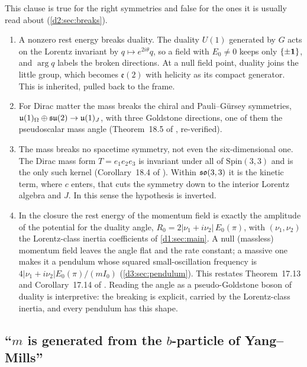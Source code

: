 This clause is true for the right symmetries and false for the ones it is usually read about (\cref{d2:sec:breaks}).
\begin{enumerate}
\item A nonzero rest energy breaks duality. The duality $U(1)$ generated by $G$ acts on the Lorentz invariant by $q\mapsto e^{2i\theta}q$, so
a field with $E_0\neq0$ keeps only $\{\pm\mathbf 1\}$, and $\arg q$ labels the broken directions. At a null field point, duality joins the
little group, which becomes $\mathfrak e(2)$ with helicity as its compact generator. This is inherited, pulled back to the frame.
\item For Dirac matter the mass breaks the chiral and Pauli--G\"ursey symmetries, $\mathfrak{u}(1)_\Omega\oplus\mathfrak{su}(2)\to\mathfrak{u}(1)_J$, with three Goldstone
directions, one of them the pseudoscalar mass angle (Theorem~18.5 of \cite{ES17}, re-verified).
\item The mass breaks no spacetime symmetry, not even the six-dimensional one. The Dirac mass form $T=e_1e_2e_3$ is invariant under all of
$\mathrm{Spin}(3,3)$ and is the only such kernel (Corollary~18.4 of \cite{ES17}). Within $\mathfrak{so}(3,3)$ it is the kinetic term, where $c$
enters, that cuts the symmetry down to the interior Lorentz algebra and $J$. In this sense the hypothesis is inverted.
\item In the closure the rest energy of the momentum field is exactly the amplitude of the potential for the duality angle,
$R_0=2|\nu_1+i\nu_2|\,E_0(\pi)$, with $(\nu_1,\nu_2)$ the Lorentz-class inertia coefficients of
\cref{d1:sec:main}. A null (massless) momentum field leaves the angle flat and the rate constant; a massive one makes it a pendulum
whose squared small-oscillation frequency is
$4|\nu_1+i\nu_2|E_0(\pi)/(mI_0)$ (\cref{d3:sec:pendulum}). This restates Theorem~17.13 and
Corollary~17.14 of \cite{ES17}. Reading the angle as a pseudo-Goldstone boson of duality is interpretive: the breaking is explicit, carried
by the Lorentz-class inertia, and every pendulum has this shape.
\end{enumerate}

\subsection{\texorpdfstring{``$m$ is generated from the $b$-particle of Yang--Mills''}{"m is generated from the b-particle of Yang-Mills"}}

